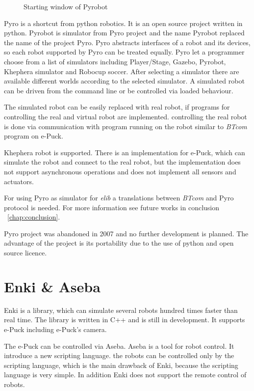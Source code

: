 \begin{figure}
\begin{picture}
    \end{picture}%
  \fi
  \caption{\label{pic:pyrobot_win}%
   Starting window of Pyrobot}
  \end{figure}



  Pyro is a shortcut from python robotics. It is an open source project written in python. Pyrobot is simulator
  from Pyro project and the name Pyrobot replaced the name of the project Pyro. 
  Pyro abstracts interfaces of a robot and
  its devices, so each robot supported by Pyro can be treated equally.
  Pyro let a programmer choose from a list of simulators including Player/Stage, Gazebo, Pyrobot, Khephera simulator
  and Robocup soccer.
  After selecting a simulator there are available different worlds according to the selected simulator.
  A simulated robot can be driven from the command line or be controlled via loaded behaviour.
  
  The simulated robot can be easily replaced with real robot, if programs for controlling the real 
  and virtual robot are implemented. 	
  controlling the real robot is done via communication with program running on the robot similar 
  to {\it BTcom} program on e-Puck.
  
  Khephera robot is supported. There is an implementation for e-Puck, which can simulate the robot
  and connect to the real robot, but the implementation does not support asynchronous operations and does 
  not implement all sensors and actuators.
  
  For using Pyro as simulator for {\it elib} a translations between {\it BTcom} and Pyro protocol is needed.
  For more information see future works in conclusion ~\ref{chap:conclusion}.	
  
  Pyro project was abandoned in 2007 and no further development is planned.
  The advantage of the project is its portability due to the use of python and open source licence.
\section{Enki \& Aseba\cite{enki}}
  Enki is a library, which can simulate several robots hundred times faster than real time.
  The library is written in C++ and is still in development. It supports e-Puck including e-Puck's camera. 
  
  The e-Puck can be controlled via Aseba. Aseba is a tool for robot control.
  It introduce a new scripting language. 
  the robots can be controlled only by the scripting language, which is the main
  drawback of Enki, because the scripting language is very simple.
  In addition Enki does not support the remote control of robots.
